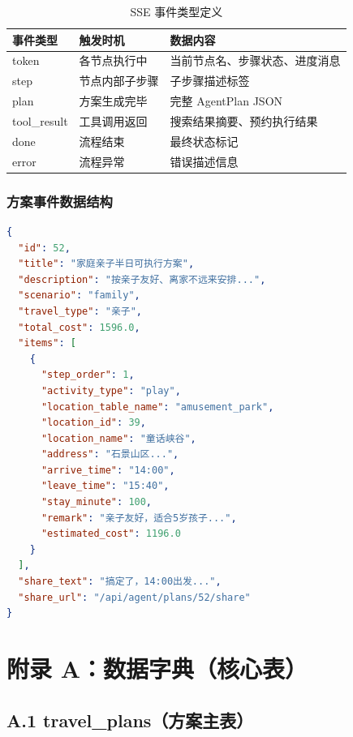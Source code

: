\documentclass[12pt,a4paper]{ctexart}
\begin{document}
\begin{table}[ht]
\centering
\begin{tabular}{p{3cm}p{3cm}p{7cm}}
\toprule
\textbf{事件类型} & \textbf{触发时机} & \textbf{数据内容} \\
\midrule
token       & 各节点执行中     & 当前节点名、步骤状态、进度消息 \\
step        & 节点内部子步骤   & 子步骤描述标签 \\
plan        & 方案生成完毕     & 完整 AgentPlan JSON \\
tool\_result & 工具调用返回     & 搜索结果摘要、预约执行结果 \\
done        & 流程结束         & 最终状态标记 \\
error       & 流程异常         & 错误描述信息 \\
\bottomrule
\end{tabular}
\caption{SSE 事件类型定义}
\label{tab:sse-events}
\end{table}

\subsubsection{方案事件数据结构}

\begin{lstlisting}[language=json]
{
  "id": 52,
  "title": "家庭亲子半日可执行方案",
  "description": "按亲子友好、离家不远来安排...",
  "scenario": "family",
  "travel_type": "亲子",
  "total_cost": 1596.0,
  "items": [
    {
      "step_order": 1,
      "activity_type": "play",
      "location_table_name": "amusement_park",
      "location_id": 39,
      "location_name": "童话峡谷",
      "address": "石景山区...",
      "arrive_time": "14:00",
      "leave_time": "15:40",
      "stay_minute": 100,
      "remark": "亲子友好，适合5岁孩子...",
      "estimated_cost": 1196.0
    }
  ],
  "share_text": "搞定了，14:00出发...",
  "share_url": "/api/agent/plans/52/share"
}
\end{lstlisting}

\newpage

\section*{附录 A：数据字典（核心表）}

\subsection*{A.1 travel\_plans（方案主表）}
\end{document}
